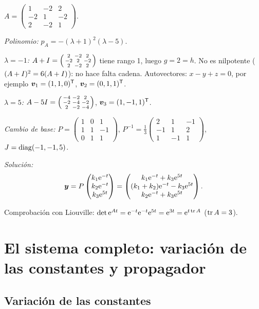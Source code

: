 \documentclass[11pt,twoside]{article}
\newcommand\vy{\bm{y}}
\newcommand\vv{\bm{v}}
\newcommand\mat[1]{\begin{pmatrix}#1\end{pmatrix}}
\newcommand\smat[1]{\left(\begin{smallmatrix}#1\end{smallmatrix}\right)}
\begin{document}
\begin{ejemplo}\label{ej:4-4}
$A=\smat{1&-2&2\\-2&1&-2\\2&-2&1}$.
\begin{pasos}
\item \emph{Polinomio:} $p_A=-(\lambda+1)^2(\lambda-5)$.
\item \emph{$\lambda=-1$:} $A+\Id=\smat{2&-2&2\\-2&2&-2\\2&-2&2}$ tiene rango 1, luego $g=2=h$. No es nilpotente
($(A+I)^2=6(A+I)$): no hace falta cadena. Autovectores: $x-y+z=0$, por ejemplo $\vv_1=(1,1,0)\T$,
$\vv_2=(0,1,1)\T$.
\item \emph{$\lambda=5$:} $A-5\Id=\smat{-4&-2&2\\-2&-4&-2\\2&-2&-4}$, $\vv_3=(1,-1,1)\T$.
\item \emph{Cambio de base:} $P=\smat{1&0&1\\1&1&-1\\0&1&1}$, $P^{-1}=\frac13\smat{2&1&-1\\-1&1&2\\1&-1&1}$,
$J=\operatorname{diag}(-1,-1,5)$.
\item \emph{Solución:}
\begin{equation*}
\vy=P\mat{k_1\e^{-t}\\k_2\e^{-t}\\k_3\e^{5t}}=\mat{k_1\e^{-t}+k_3\e^{5t}\\ (k_1+k_2)\e^{-t}-k_3\e^{5t}\\ k_2\e^{-t}+k_3\e^{5t}}.
\end{equation*}
\end{pasos}
Comprobación con Liouville: $\det\mathrm{e}^{At}=\mathrm{e}^{-t}\mathrm{e}^{-t}\mathrm{e}^{5t}=\mathrm{e}^{3t}=\mathrm{e}^{t\operatorname{tr} A}$ ($\operatorname{tr} A=3$).
\end{ejemplo}

\section{El sistema completo: variación de las constantes y propagador}\label{sec:completo}

\subsection{Variación de las constantes}
\end{document}
